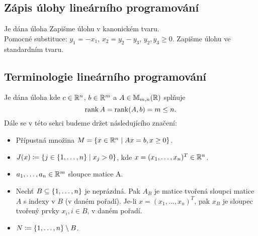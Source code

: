 \subsection{Zápis úlohy lineárního programování}
Je dána úloha
Zapišme úlohu v kanonickém tvaru.\\
Pomocné substituce: $y_1 = -x_1$, $x_2 = y_2 - y_3$, $y_2, y_3 \geq 0$.
Zapišme úlohu ve standardním tvaru.

\subsection{Terminologie lineárního programování}
Je dána úloha
kde $c\in \mathbb{R}^n$, $b \in \mathbb{R}^m$ a $A \in \mathbb{M}_{m,n}(\mathbb{R})$ splňuje
\[
    \operatorname*{rank} A = \operatorname*{rank} (A, b) = m \leq n.
\]
Dále se v této sekci budeme držet následujícího značení:
\begin{itemize}
    \item Přípustná množina $M = \left\lbrace x \in \mathbb{R}^n \mid Ax = b, x\geq 0 \right\rbrace$.
    \item $J(x) \coloneqq \left\lbrace j \in \left\lbrace 1, \dots, n \right\rbrace \mid x_j > 0 \right\rbrace$, kde $x = (x_1, \dots, x_n)^T \in \mathbb{R}^n$.
    \item $a_1, \dots, a_n \in \mathbb{R}^m$ sloupce matice A.
    \item Nechť $B \subseteq \left\lbrace 1, \dots, n \right\rbrace$ je neprázdná. Pak $A_B$ je matice tvořená sloupci matice $A$ s indexy v 
    $B$ (v daném pořadí). Je-li $x = (x_1, \dots, x_n)^T$, pak $x_B$ je sloupec tvořený prvky $x_i, i \in B$, v daném 
    pořadí.
    \item $N \coloneqq \left\lbrace 1, \dots, n \right\rbrace \setminus B$.
\end{itemize}

